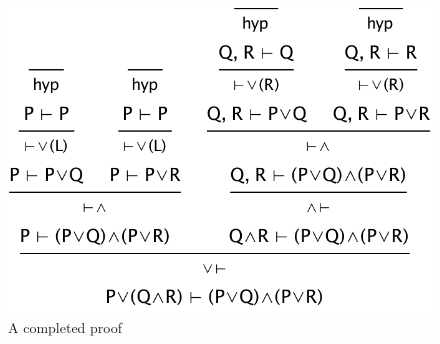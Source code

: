 \documentclass[11pt]{article}
\newcommand{\picscale}{0.6}
\begin{document}
\begin{figure}
\centering
\includegraphics[scale=\picscale]{pics/secondtree}
\caption{A completed proof}
\label{fig:secondtree}
\end{figure}
\end{document}

